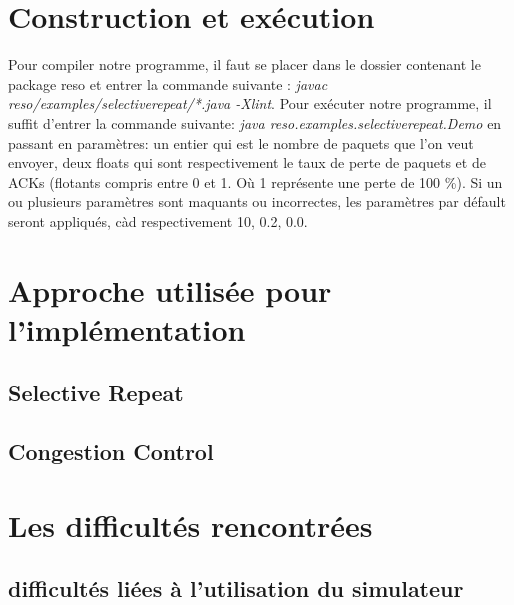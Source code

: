 \documentclass[a4paper, 12pt]{article}
\begin{document}
\tableofcontents

\pagebreak

\section{Construction et exécution}
	Pour compiler notre programme, il faut se placer dans le dossier contenant le package reso et entrer la commande suivante : \textit{javac reso/examples/selectiverepeat/*.java -Xlint}.
	Pour exécuter notre programme, il suffit d'entrer la commande suivante: \textit{java reso.examples.selectiverepeat.Demo} en passant en paramètres: un entier qui est le nombre de paquets que l'on veut envoyer, deux floats qui sont respectivement le taux de perte de paquets et de ACKs (flotants compris entre 0 et 1. Où 1 représente une perte de 100 \%). Si un ou plusieurs paramètres sont maquants ou incorrectes, les paramètres par défault seront appliqués, càd respectivement 10, 0.2, 0.0.

\section{Approche utilisée pour l'implémentation}
	\subsection{Selective Repeat}
		\begin{itemize}
			

		\end{itemize}

	\subsection{Congestion Control}
		\begin{itemize}
			
		\end{itemize}

\section{Les difficultés rencontrées}
	
	\subsection{difficultés liées à l'utilisation du simulateur}
		\begin{itemize}

		\end{itemize}
\end{document}
